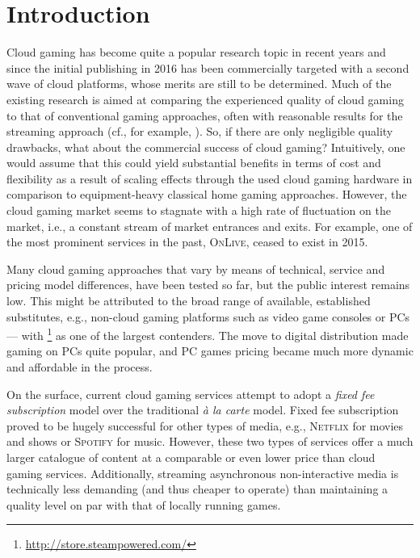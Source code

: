 \section{Introduction}

Cloud gaming has become quite a popular research topic in recent years and since the initial publishing in 2016 has been commercially targeted with a second wave of cloud platforms, whose merits are still to be determined. Much of the existing research is aimed at comparing the experienced quality of cloud gaming to that of conventional gaming approaches, often with reasonable results for the streaming approach (cf., for example, \cite{5976180}). So, if there are only negligible quality drawbacks, what about the commercial success of cloud gaming? Intuitively, one would assume that this could yield substantial benefits in terms of cost and flexibility as a result of scaling effects through the used cloud gaming hardware in comparison to equipment-heavy classical home gaming approaches. However, the cloud gaming market seems to stagnate with a high rate of fluctuation on the market, i.e., a constant stream of market entrances and exits. For example, one of the most prominent services in the past, \textsc{OnLive}, ceased to exist in 2015.

Many cloud gaming approaches that vary by means of technical, service and pricing model differences, have been tested so far, but the public interest remains low. This might be attributed to the broad range of available, established substitutes, e.g., non-cloud gaming platforms such as video game consoles or PCs --- with \steam\footnote{\url{http://store.steampowered.com/}} as one of the largest contenders. The move to digital distribution made gaming on PCs quite popular, and PC games pricing became much more dynamic and affordable in the process.

On the surface, current cloud gaming services attempt to adopt a \textit{fixed fee subscription} model over the traditional \textit{à la carte} model. Fixed fee subscription proved to be hugely successful for other types of media, e.g., \textsc{Netflix} for movies and shows or \textsc{Spotify} for music. However, these two types of services offer a much larger catalogue of content at a comparable or even lower price than cloud gaming services. Additionally, streaming asynchronous non-interactive media is technically less demanding (and thus cheaper to operate) than maintaining a quality level on par with that of locally running games.

